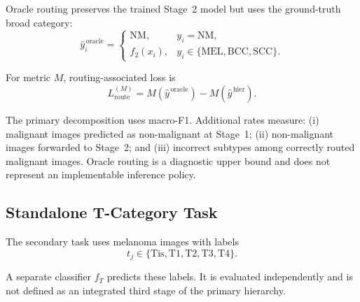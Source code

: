 Oracle routing preserves the trained Stage~2 model but uses the ground-truth
broad category:
\begin{equation}
\hat{y}^{\,\mathrm{oracle}}_i =
\begin{cases}
\mathrm{NM}, & y_i=\mathrm{NM},\\
f_2(x_i), &
y_i\in\{\mathrm{MEL},\mathrm{BCC},\mathrm{SCC}\}.
\end{cases}
\end{equation}

For metric $M$, routing-associated loss is
\begin{equation}
L_{\mathrm{route}}^{(M)}
=
M(\hat{y}^{\,\mathrm{oracle}})
-
M(\hat{y}^{\,\mathrm{hier}}).
\end{equation}

The primary decomposition uses macro-F1. Additional rates measure:
(i) malignant images predicted as non-malignant at Stage~1;
(ii) non-malignant images forwarded to Stage~2; and
(iii) incorrect subtypes among correctly routed malignant images.
Oracle routing is a diagnostic upper bound and does not represent an
implementable inference policy.

\subsection{Standalone T-Category Task}

The secondary task uses melanoma images with labels
\begin{equation}
t_j\in
\{
\mathrm{Tis},
\mathrm{T1},
\mathrm{T2},
\mathrm{T3},
\mathrm{T4}
\}.
\end{equation}

A separate classifier $f_T$ predicts these labels. It is evaluated
independently and is not defined as an integrated third stage of the primary
hierarchy.